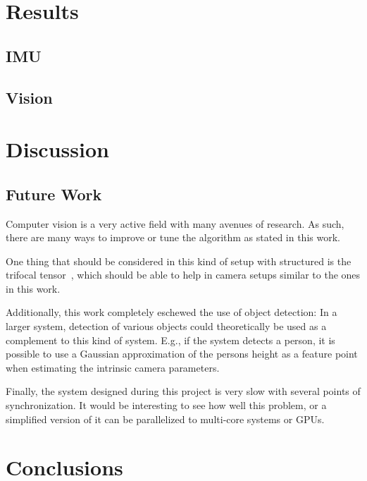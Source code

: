 \documentclass[preprint,acmtog]{acmart}
\begin{document}
\section{Results}

\subsection{IMU}


\subsection{Vision}



\section{Discussion}



\subsection{Future Work}

Computer vision is a very active field with many avenues of research. As such,
there are many ways to improve or tune the algorithm as stated in this work.

One thing that should be considered in this kind of setup with structured is the
trifocal tensor~\cite{Martyushev_2017}, which should be able to help in camera
setups similar to the ones in this work.

Additionally, this work completely eschewed the use of object detection: In a
larger system, detection of various objects could theoretically be used as a
complement to this kind of system. E.g., if the system detects a person, it is
possible to use a Gaussian approximation of the persons height as a feature
point when estimating the intrinsic camera parameters.

Finally, the system designed during this project is very slow with several
points of synchronization. It would be interesting to see how well this problem,
or a simplified version of it can be parallelized to multi-core systems or GPUs.


\section{Conclusions}



\begin{acks}
\end{acks}



\end{document}
